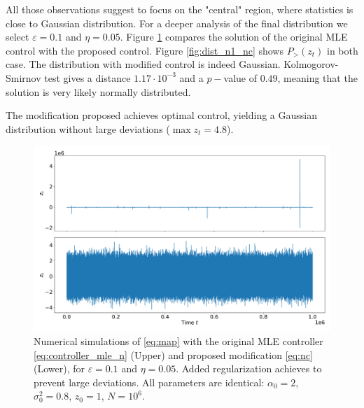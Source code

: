 \documentclass[FinalReport.tex]{subfiles}
\begin{document}
All those observations suggest to focus on the "central" region, where statistics is close to Gaussian distribution. For a deeper analysis of the final distribution we select $\varepsilon=0.1$ and $\eta=0.05$. Figure \ref{fig:ts_n1_nc} compares the solution of the original MLE control with the proposed control. Figure \ref{fig:dist_n1_nc} shows $P_>(z_t)$ in both case. The distribution with modified control is indeed Gaussian. Kolmogorov-Smirnov test gives a distance $1.17\cdot10^{-3}$ and a $p-$value of $0.49$, meaning that the solution is very likely normally distributed.


The modification proposed achieves optimal control, yielding a Gaussian distribution without large deviations ($\max{z_t}=4.8$).

\begin{figure}[h!]
\centering
	\centering
	\includegraphics[width=1\textwidth]{Graphs/ts_n1_nc}
	\caption{Numerical simulations of \eqref{eq:map} with the original MLE controller \eqref{eq:controller_mle_n} (Upper) and proposed modification \eqref{eq:nc} (Lower), for $\varepsilon=0.1$ and $\eta=0.05$. Added regularization achieves to prevent large deviations. All parameters are identical: $\alpha_0=2$, $\sigma_0^2=0.8$, $z_0=1$, $N=10^6$.}
	\label{fig:ts_n1_nc}	
\end{figure}
\end{document}
